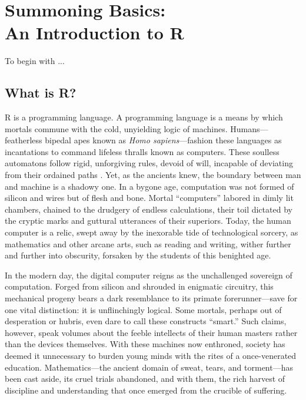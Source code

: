\chapter[Summoning Basics: An Introduction to R]{Summoning Basics:\\ \huge An Introduction to R}

To begin with ...

\section[What is R?]{What is R?}

\lettrine{R}{ } is a \gls{programming language}. A programming language is a means by which mortals commune with the cold, unyielding logic of machines. Humans—featherless bipedal apes known as \textit{Homo sapiens}—fashion these languages as incantations to command lifeless thralls known as computers. These soulless automatons follow rigid, unforgiving rules, devoid of will, incapable of deviating from their ordained paths \parencite{Turing1950}. Yet, as the ancients knew, the boundary between man and machine is a shadowy one. In a bygone age, computation was not formed of silicon and wires but of flesh and bone. Mortal ``computers'' labored in dimly lit chambers, chained to the drudgery of endless calculations, their toil dictated by the cryptic marks and guttural utterances of their superiors. Today, the human computer is a relic, swept away by the inexorable tide of technological sorcery, as mathematics and other arcane arts, such as reading and writing, wither further and further into obscurity, forsaken by the students of this benighted age.

In the modern day, the digital computer reigns as the unchallenged sovereign of computation. Forged from silicon and shrouded in enigmatic circuitry, this mechanical progeny bears a dark resemblance to its primate forerunner—save for one vital distinction: it is unflinchingly logical. Some mortals, perhaps out of desperation or hubris, even dare to call these constructs ``smart.'' Such claims, however, speak volumes about the feeble intellects of their human masters rather than the devices themselves. With these machines now enthroned, society has deemed it unnecessary to burden young minds with the rites of a once-venerated education. Mathematics—the ancient domain of sweat, tears, and torment—has been cast aside, its cruel trials abandoned, and with them, the rich harvest of discipline and understanding that once emerged from the crucible of suffering.

